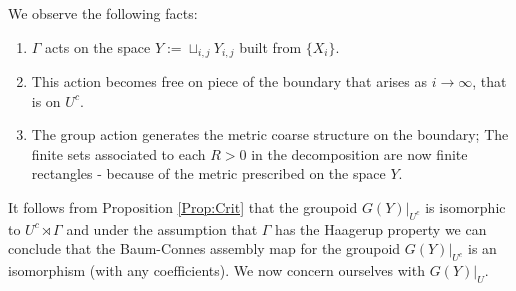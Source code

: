 We observe the following facts: 
\begin{enumerate}
\item $\Gamma$ acts on the space $Y:=\sqcup_{i,j}Y_{i,j}$ built from $\lbrace X_{i} \rbrace$.
\item This action becomes free on piece of the boundary that arises as $i \rightarrow \infty$, that is on $U^{c}$.
\item The group action generates the metric coarse structure on the boundary; The finite sets associated to each $R>0$ in the decomposition are now finite rectangles - because of the metric prescribed on the space $Y$.
\end{enumerate} 

It follows from Proposition \ref{Prop:Crit} that the groupoid $G(Y)|_{U^{c}}$ is isomorphic to $U^{c}\rtimes \Gamma$ and under the assumption that $\Gamma$ has the Haagerup property we can conclude that the Baum-Connes assembly map for the groupoid $G(Y)|_{U^{c}}$ is an isomorphism (with any coefficients). We now concern ourselves with $G(Y)|_{U}$.

